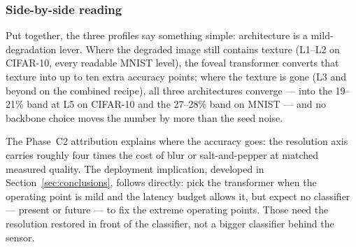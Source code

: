 \subsubsection{Side-by-side reading}
\label{sec:cm:sidebyside}

Put together, the three profiles say something simple: architecture is a
mild-degradation lever. Where the degraded image still contains texture
(L1--L2 on CIFAR-10, every readable MNIST level), the foveal transformer
converts that texture into up to ten extra accuracy points; where the
texture is gone (L3 and beyond on the combined recipe), all three
architectures converge --- into the 19--21\% band at L5 on CIFAR-10 and the
27--28\% band on MNIST --- and no backbone choice moves the number by more
than the seed noise.

The Phase~C2 attribution explains where the accuracy goes: the resolution
axis carries roughly four times the cost of blur or salt-and-pepper at
matched measured quality. The deployment implication, developed in
Section~\ref{sec:conclusions}, follows directly: pick the transformer when
the operating point is mild and the latency budget allows it, but expect no
classifier --- present or future --- to fix the extreme operating points.
Those need the resolution restored in front of the classifier, not a bigger
classifier behind the sensor.
